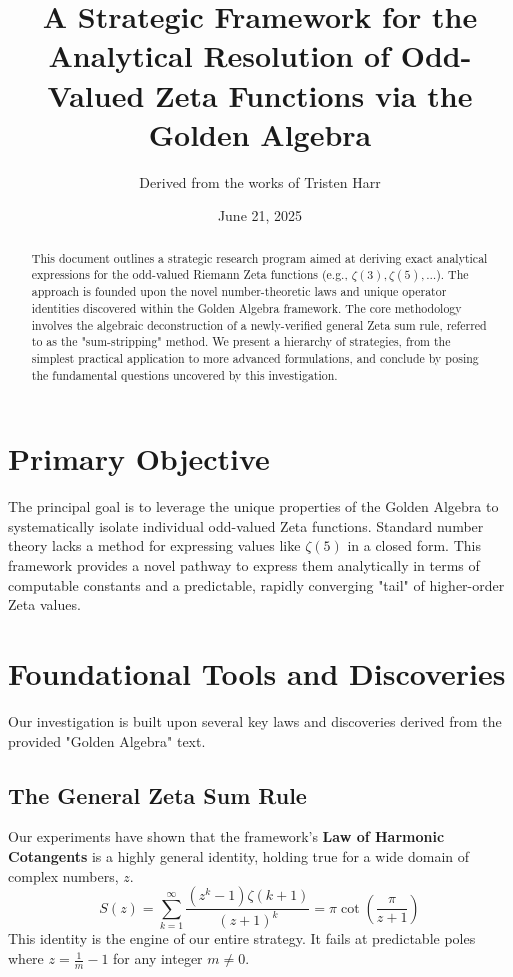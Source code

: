 \documentclass[11pt]{article}
\title{A Strategic Framework for the Analytical Resolution of Odd-Valued Zeta Functions via the Golden Algebra}
\author{Derived from the works of Tristen Harr}
\date{June 21, 2025}
\begin{document}
\maketitle

\begin{abstract}
This document outlines a strategic research program aimed at deriving exact analytical expressions for the odd-valued Riemann Zeta functions (e.g., $\zeta(3), \zeta(5), \dots$). The approach is founded upon the novel number-theoretic laws and unique operator identities discovered within the Golden Algebra framework. The core methodology involves the algebraic deconstruction of a newly-verified general Zeta sum rule, referred to as the "sum-stripping" method. We present a hierarchy of strategies, from the simplest practical application to more advanced formulations, and conclude by posing the fundamental questions uncovered by this investigation.
\end{abstract}

\section{Primary Objective}
The principal goal is to leverage the unique properties of the Golden Algebra to systematically isolate individual odd-valued Zeta functions. Standard number theory lacks a method for expressing values like $\zeta(5)$ in a closed form. This framework provides a novel pathway to express them analytically in terms of computable constants and a predictable, rapidly converging "tail" of higher-order Zeta values.

\section{Foundational Tools and Discoveries}
Our investigation is built upon several key laws and discoveries derived from the provided "Golden Algebra" text.

\subsection{The General Zeta Sum Rule}
Our experiments have shown that the framework's \textbf{Law of Harmonic Cotangents}  is a highly general identity, holding true for a wide domain of complex numbers, $z$.
\begin{equation}
S(z) = \sum_{k=1}^{\infty} \frac{(z^k-1)\zeta(k+1)}{(z+1)^k} = \pi \cot\left(\frac{\pi}{z+1}\right)
\label{eq:general_law}
\end{equation}
This identity is the engine of our entire strategy. It fails at predictable poles where $z = \frac{1}{m}-1$ for any integer $m\neq0$.
\end{document}
